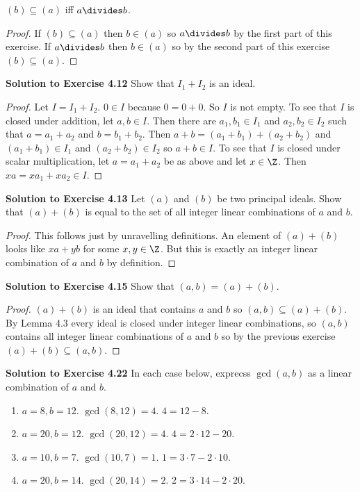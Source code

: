\documentclass[oneside,12pt]{amsart}
\begin{document}
$(b)\subseteq (a)$ iff $a\divides b$.
\begin{proof}
If $(b)\subseteq (a)$ then $b\in (a)$ so $a\divides b$ by the first part of this exercise. If $a\divides b$ then $b\in (a)$ so by the second part of
this exercise $(b)\subseteq (a)$.
\end{proof}

\bigskip

\textbf{Solution to Exercise 4.12}  Show that $I_1+I_2$ is an ideal.
\begin{proof}
Let $I=I_1+I_2$. $0\in I$ because $0=0+0$. So $I$ is not empty. To see that $I$ is closed under addition,
let $a,b\in I$. Then there are $a_1,b_1\in I_1$ and $a_2,b_2\in I_2$ such that $a=a_1+a_2$ and $b=b_1+b_2$.
Then $a+b = (a_1+b_1) + (a_2 + b_2)$ and $(a_1+b_1)\in I_1$ and $(a_2+b_2)\in I_2$ so $a+b\in I$.
To see that $I$ is closed under scalar multiplication, let $a=a_1+a_2$ be as above and let $x\in\Z$.
Then $xa=xa_1+xa_2\in I$.
\end{proof}

\bigskip

\textbf{Solution to Exercise 4.13}  Let $(a)$ and $(b)$ be two principal ideals. Show that $(a)+(b)$ is equal to the set of all integer linear combinations of $a$ and $b$.
\begin{proof}
This follows just by unravelling definitions. An element of $(a)+(b)$ looks like $xa+yb$ for some $x,y\in\Z$.
But this is exactly an integer linear combination of $a$ and $b$ by definition.
\end{proof}

\bigskip

\textbf{Solution to Exercise 4.15}  Show that $(a,b)=(a)+(b)$.
\begin{proof}
$(a)+(b)$ is an ideal that contains $a$ and $b$ so $(a,b)\subseteq(a)+(b)$. By Lemma 4.3 every ideal
is closed under integer linear combinations, so $(a,b)$ contains all integer linear combinations of $a$ and $b$
so by the previous exercise $(a)+(b)\subseteq (a,b)$.
\end{proof}

\bigskip

\textbf{Solution to Exercise 4.22} In each case below, exprecss $\gcd(a,b)$ as a linear combination of $a$ and $b$.
\begin{enumerate}
\item $a=8,b=12$. $\gcd(8,12)=4$. $4=12-8$.
\item $a=20,b=12$. $\gcd(20,12)=4$. $4=2\cdot 12 - 20$.
\item $a=10,b=7$. $\gcd(10,7)=1$. $1=3\cdot 7 - 2 \cdot 10$.
\item $a=20,b=14$. $\gcd(20,14)=2$. $2=3 \cdot 14-2\cdot20$.
\end{enumerate}
\end{document}
